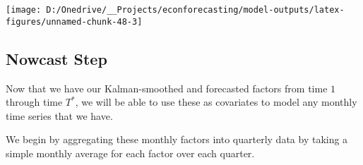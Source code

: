 \documentclass[11pt, letterpaper]{article}\usepackage[]{graphicx}\usepackage[]{color}
\begin{document}
{\centering \texttt{[image: D:/Onedrive/\_\_Projects/econforecasting/model-outputs/latex-figures/unnamed-chunk-48-3]} 

}





\subsection{Nowcast Step}
Now that we have our Kalman-smoothed and forecasted factors from time $1$ through time $T^*$, we will be able to use these as covariates to model any monthly time series that we have.

We begin by aggregating these monthly factors into quarterly data by taking a simple monthly average for each factor over each quarter.
\end{document}
